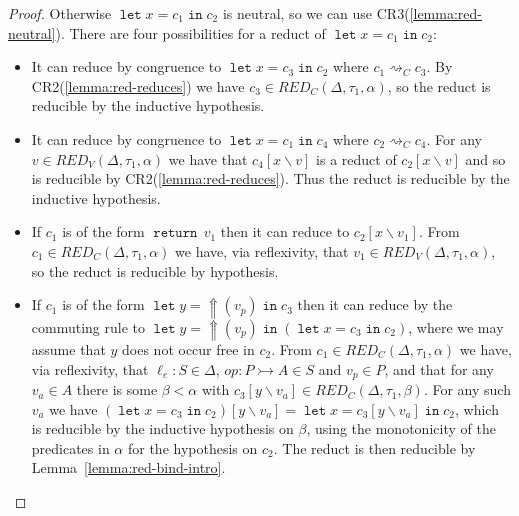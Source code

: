 \documentclass[acmsmall, screen, review, anonymous]{acmart}
\theoremstyle{definition}
\newcommand{\reflectname}{\mathord{\Uparrow}}
\newcommand{\performraw}[2]{\mathop{\reflectname(#1(#2))}}
\newcommand{\perform}[3]{\performraw{#1}{#2}(#3)}
\newcommand{\loc}{\ell}
\newcommand{\types}{\mathrel{:}}
\newcommand{\returnname}{\mathop{\mathtt{return}}}
\newcommand{\return}[1]{\returnname\, #1}
\newcommand{\letvname}{\mathop{\mathtt{let}}}
\newcommand{\letv}[3]{\letvname #1 = #2 \mathop{\mathtt{in}} #3}
\newcommand{\sub}[2]{[#1\backslash#2]}
\newcommand{\sbst}[3]{#1\sub{#2}{#3}}
\newcommand{\stepstoname}{\rightsquigarrow}
\newcommand{\stepstoc}{\stepstoname_C}
\newcommand{\redname}{RED}
\newcommand{\redvname}{\redname_{V}}
\newcommand{\redva}[3]{\redvname{({#1},{#2},{#3})}}
\newcommand{\redcname}{\redname_{C}}
\newcommand{\redca}[3]{\redcname{({#1},{#2},{#3})}}
\begin{document}
\begin{proof}
  Otherwise $\letv{x}{c_1}{c_2}$ is neutral, so we can use
  CR3(\ref{lemma:red-neutral}). There are four possibilities for a
  reduct of $\letv{x}{c_1}{c_2}$:
  \begin{itemize}
  \item It can reduce by congruence to $\letv{x}{c_3}{c_2}$ where
    $c_1 \stepstoc c_3$. By CR2(\ref{lemma:red-reduces}) we have
    $c_3 \in \redca{\Delta}{\tau_1}{\alpha}$, so the reduct is reducible
    by the inductive hypothesis.
  \item It can reduce by congruence to $\letv{x}{c_1}{c_4}$ where
    $c_2 \stepstoc c_4$. For any $v \in \redva{\Delta}{\tau_1}{\alpha}$
    we have that $\sbst{c_4}{x}{v}$ is a reduct of $\sbst{c_2}{x}{v}$
    and so is reducible by CR2(\ref{lemma:red-reduces}). Thus the reduct
    is reducible by the inductive hypothesis.
  \item If $c_1$ is of the form $\return{v_1}$ then it can reduce to
    $\sbst{c_2}{x}{v_1}$. From $c_1 \in \redca{\Delta}{\tau_1}{\alpha}$
    we have, via reflexivity, that
    $v_1 \in \redva{\Delta}{\tau_1}{\alpha}$, so the reduct is reducible
    by hypothesis.
  \item If $c_1$ is of the form
    $\letv{y}{\perform{\loc_e}{op}{v_p}}{c_3}$ then it can reduce by the
    commuting rule to
    $\letv{y}{\perform{\loc_e}{op}{v_p}}{(\letv{x}{c_3}{c_2})}$, where
    we may assume that $y$ does not occur free in $c_2$. From
    $c_1 \in \redca{\Delta}{\tau_1}{\alpha}$ we have, via reflexivity,
    that $\loc_e \types S \in \Delta$,
    $op \types P \rightarrowtail A \in S$ and $v_p \in P$, and that
    for any $v_a \in A$ there is some $\beta < \alpha$ with
    $\sbst{c_3}{y}{v_a} \in \redca{\Delta}{\tau_1}{\beta}$. For any
    such $v_a$ we have
    $\sbst{(\letv{x}{c_3}{c_2})}{y}{v_a} =
    \letv{x}{\sbst{c_3}{y}{v_a}}{c_2}$, which is reducible by the
    inductive hypothesis on $\beta$, using the monotonicity of the
    predicates in $\alpha$ for the hypothesis on $c_2$. The reduct is
    then reducible by Lemma~\ref{lemma:red-bind-intro}.
  \end{itemize}
\end{proof}
\end{document}
